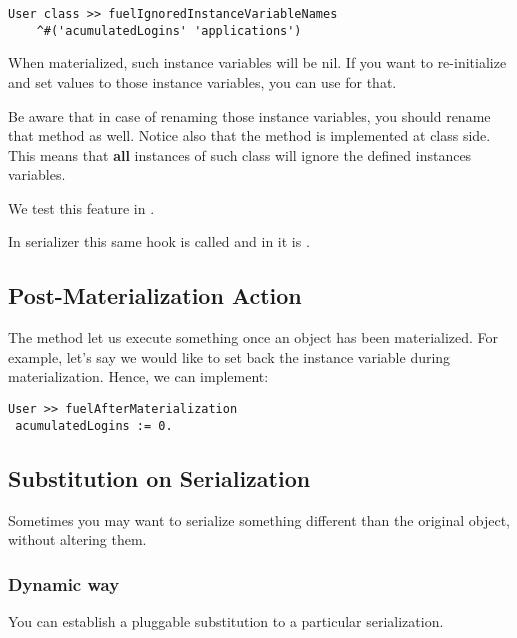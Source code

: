 \documentclass[a4paper,10pt,twoside]{book}
\begin{document}
\begin{lstlisting}
User class >> fuelIgnoredInstanceVariableNames
    ^#('acumulatedLogins' 'applications')
\end{lstlisting}

When materialized, such instance variables will be nil. If you want to re-initialize and set values to those instance variables, you can use  for that.

Be aware that in case of renaming those instance variables, you should rename that method as well. Notice also that the method  is implemented at class side. This means that \textbf{all} instances of such class will ignore the defined instances variables. 

We test this feature in .

In  serializer this same hook is called  and in  it is . 

\subsection{Post-Materialization Action}

The method  let us execute something once an object has been materialized. For example, let's say we would like to set back the instance variable  during materialization. Hence, we can implement:

\begin{lstlisting}
User >> fuelAfterMaterialization
 acumulatedLogins := 0. 
\end{lstlisting}

\subsection{Substitution on Serialization}

Sometimes you may want to serialize something different than the original object, without altering them.

\subsubsection{Dynamic way}

You can establish a pluggable substitution to a particular serialization. 
\end{document}
